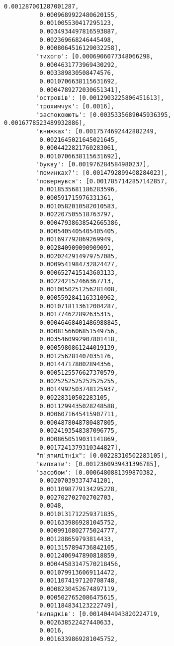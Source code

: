 \documentclass[11pt]{article}
\begin{document}
\begin{Verbatim}[commandchars=\\\{\}]
          0.001287001287001287,
          0.0009689922480620155,
          0.001005530417295123,
          0.0034934497816593887,
          0.002369668246445498,
          0.0008064516129032258],
         'тихого': [0.0006906077348066298,
          0.0004631773969430292,
          0.003389830508474576,
          0.0010706638115631692,
          0.0004789272030651341],
         'островів': [0.0012903225806451613],
         'трохимчук': [0.0016],
         'заспокоюють': [0.0035335689045936395, 0.0016778523489932886],
         'книжках': [0.0017574692442882249,
          0.0021645021645021645,
          0.0004422821760283061,
          0.0010706638115631692],
         'букву': [0.001976284584980237],
         'поминках?': [0.0014792899408284023],
         'повернувся': [0.0017857142857142857,
          0.0018535681186283596,
          0.000591715976331361,
          0.0010582010582010583,
          0.002207505518763797,
          0.00047938638542665386,
          0.0005405405405405405,
          0.001697792869269949,
          0.002840909090909091,
          0.0020242914979757085,
          0.0009541984732824427,
          0.0006527415143603133,
          0.002242152466367713,
          0.0010050251256281408,
          0.0005592841163310962,
          0.0010718113612004287,
          0.001774622892635315,
          0.00046468401486988845,
          0.0008156606851549756,
          0.0035460992907801418,
          0.0005980861244019139,
          0.001256281407035176,
          0.001447178002894356,
          0.0005125576627370579,
          0.0025252525252525255,
          0.0014992503748125937,
          0.00228310502283105,
          0.0011299435028248588,
          0.0006071645415907711,
          0.0004878048780487805,
          0.0024193548387096775,
          0.0008650519031141869,
          0.0017241379310344827],
         "п'ятилітніх": [0.00228310502283105],
         'випхати': [0.0012360939431396785],
         'засобом': [0.0006480881399870382,
          0.002070393374741201,
          0.0011098779134295228,
          0.002702702702702703,
          0.0048,
          0.0010131712259371835,
          0.0016339869281045752,
          0.0009910802775024777,
          0.001288659793814433,
          0.0013157894736842105,
          0.0012406947890818859,
          0.00044583147570218456,
          0.0010799136069114472,
          0.0011074197120708748,
          0.0008230452674897119,
          0.0005027652086475615,
          0.001184834123222749],
         'випадків': [0.0014044943820224719,
          0.002638522427440633,
          0.0016,
          0.0016339869281045752,

\end{Verbatim}
\end{document}

